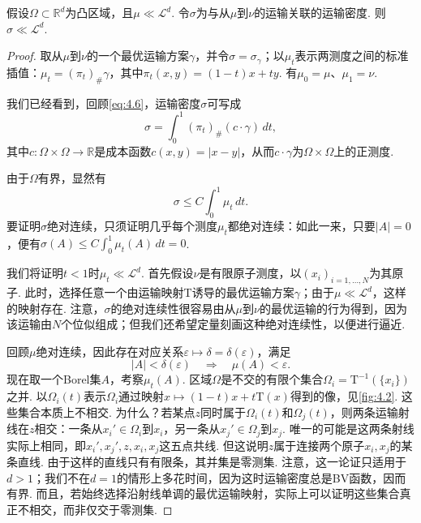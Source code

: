 \begin{theorem}\label{obj:4.16}
假设$\Omega\subset\mathbb R^d$为凸区域，且$\mu\ll\mathscr L^d$. 令$\sigma$为与从$\mu$到$\nu$的运输关联的运输密度. 则$\sigma\ll\mathscr L^d$.
\end{theorem}
\begin{proof}
取从$\mu$到$\nu$的一个最优运输方案$\gamma$，并令$\sigma=\sigma_\gamma$；以$\mu_t$表示两测度之间的标准插值：$\mu_t=(\pi_t)_\#\gamma$，其中$\pi_t(x,y)=(1-t)x+ty$. 有$\mu_0=\mu$、$\mu_1=\nu$.

我们已经看到，回顾\eqref{eq:4.6}，运输密度$\sigma$可写成
\[
\sigma=\int_0^1(\pi_t)_\#(c\cdot\gamma)\,dt,
\]
其中$c:\Omega\times\Omega\to\mathbb R$是成本函数$c(x,y)=|x-y|$，从而$c\cdot\gamma$为$\Omega\times\Omega$上的正测度.

由于$\Omega$有界，显然有
\begin{equation}\label{eq:4.11}
\sigma\leq C\int_0^1\mu_t\,dt.
\end{equation}
要证明$\sigma$绝对连续，只须证明几乎每个测度$\mu_t$都绝对连续：如此一来，只要$|A|=0$，便有$\sigma(A)\leq C\int_0^1\mu_t(A)\,dt=0$.

我们将证明$t<1$时$\mu_t\ll\mathscr L^d$. 首先假设$\nu$是有限原子测度，以$(x_i)_{i=1,\ldots,N}$为其原子. 此时，选择任意一个由运输映射$\mathrm T$诱导的最优运输方案$\gamma$；由于$\mu\ll\mathscr L^d$，这样的映射存在. 注意，$\sigma$的绝对连续性很容易由从$\mu$到$\nu$的最优运输的行为得到，因为该运输由$N$个位似组成；但我们还希望定量刻画这种绝对连续性，以便进行逼近.

回顾$\mu$绝对连续，因此存在对应关系$\varepsilon\mapsto\delta=\delta(\varepsilon)$，满足
\begin{equation}\label{eq:4.12}
|A|<\delta(\varepsilon)\quad\Longrightarrow\quad\mu(A)<\varepsilon.
\end{equation}
现在取一个Borel集$A$，考察$\mu_t(A)$. 区域$\Omega$是不交的有限个集合$\Omega_i=\mathrm T^{-1}(\{x_i\})$之并. 以$\Omega_i(t)$表示$\Omega_i$通过映射$x\mapsto(1-t)x+t\mathrm T(x)$得到的像，见\autoref{fig:4.2}. 这些集合本质上不相交. 为什么？若某点$z$同时属于$\Omega_i(t)$和$\Omega_j(t)$，则两条运输射线在$z$相交：一条从$x_i'\in\Omega_i$到$x_i$，另一条从$x_j'\in\Omega_j$到$x_j$. 唯一的可能是这两条射线实际上相同，即$x_i',x_j',z,x_i,x_j$这五点共线. 但这说明$z$属于连接两个原子$x_i,x_j$的某条直线. 由于这样的直线只有有限条，其并集是零测集. 注意，这一论证只适用于$d>1$；我们不在$d=1$的情形上多花时间，因为这时运输密度总是BV函数，因而有界. 而且，若始终选择沿射线单调的最优运输映射，实际上可以证明这些集合真正不相交，而非仅交于零测集.


\end{proof}
